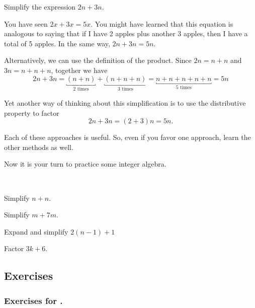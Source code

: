 \begin{exam} 
\label{exam_combining_like_terms}
    Simplify the expression $2n+3n$.
        \begin{soln}
            You have seen $2x+3x=5x$. You might have learned that this equation is analogous to saying that if I have 2 apples plus another 3 apples, then I have a total of 5 apples.  In the same way, $2n+3n=5n$.  
            
            Alternatively, we can use the definition of the product.  Since $2n = n+n$ and $3n = n+n+n$, together we have 
                $$2n + 3n = \underbracket{(n+n)}_{2 \text{ times}} +\underbracket{(n+n+n)}_{3 \text{ times}} = \underbracket{n+n+n+n+n}_{5 \text{ times}} = 5n$$
            
            Yet another way of thinking about this simplification is to use the distributive property to factor   
                $$2n+3n=(2+3)n=5n.$$  
            
            Each of these approaches is useful.  So, even if you favor one approach, learn the other methods as well.
        \end{soln}
\end{exam}

Now it is your turn to practice some integer algebra.
        
\begin{act} 
\label{act_integer_algebra}
~
    \begin{actpart}
        \item Simplify $n+n$.
        \item Simplify $m+7m$.  
        \item Expand and simplify $2(n-1)+1$
        \item Factor $3k+6$.        
    \end{actpart}
\end{act}


\subsection{Exercises}


\subsubsection{Exercises for  \subsqdom.}

